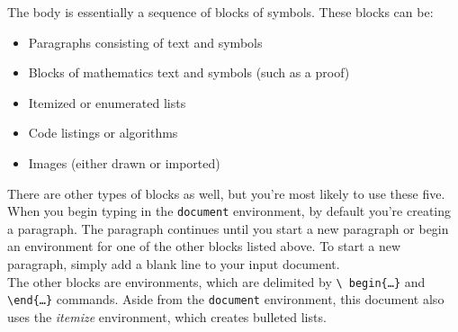 \documentclass{article}
\begin{document}
The body is essentially a sequence of blocks of symbols. These blocks can be:
\begin{itemize}
  \item Paragraphs consisting of text and symbols
  \item Blocks of mathematics text and symbols (such as a proof)
  \item Itemized or enumerated lists
  \item Code listings or algorithms
  \item Images (either drawn or imported)
\end{itemize}
There are other types of blocks as well, but you're most likely to use these
five.\\[12pt]

When you begin typing in the {\tt document} environment, by default you're
creating a paragraph. The paragraph continues until you start a new paragraph
or begin an environment for one of the other blocks listed above. To start a new
paragraph, simply add a blank line to your input document.\\[12pt]

The other blocks are environments, which are delimited by {\tt \textbackslash
begin\{\ldots\}} and {\tt \textbackslash end\{\ldots\}} commands. Aside from
the {\tt document} environment, this document also uses the \emph{itemize}
environment, which creates bulleted lists.\\[12pt]
\end{document}
